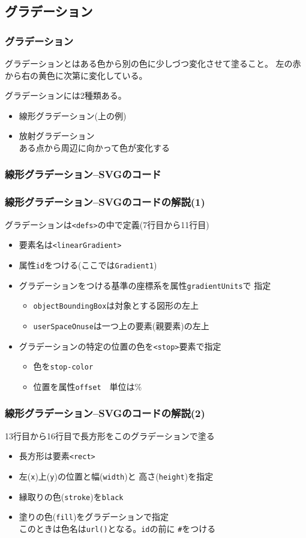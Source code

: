 \subsection{グラデーション}
\begin{frame}[containsverbatim]
 \frametitle{グラデーション}
 グラデーションとはある色から別の色に少しづつ変化させて塗ること。
 左の赤から右の黄色に次第に変化している。

 グラデーションには2種類ある。
 \begin{itemize}
	\item 線形グラデーション(上の例)
	\item 放射グラデーション\\
				ある点から周辺に向かって色が変化する
 \end{itemize}
\end{frame}
\begin{frame}[containsverbatim]
\frametitle{線形グラデーション--SVGのコード}
\end{frame}
\begin{frame}[containsverbatim]
 \frametitle{線形グラデーション--SVGのコードの解説(1)}
 グラデーションは\texttt{<defs>}の中で定義(7行目から11行目)
 \begin{itemize}
	\item 要素名は\texttt{<linearGradient>}
	\item 属性\texttt{id}をつける(ここでは\texttt{Gradient1})
	\item グラデーションをつける基準の座標系を属性\texttt{gradientUnits}で
				指定\\
				\begin{itemize}
				 \item \texttt{objectBoundingBox}は対象とする図形の左上
				 \item \texttt{userSpaceOnuse}は一つ上の要素(親要素)の左上
				\end{itemize}
	\item グラデーションの特定の位置の色を\texttt{<stop>}要素で指定
				\begin{itemize}
				 \item 色を\texttt{stop-color}
				 \item 位置を属性\texttt{offset}　単位は\%
				\end{itemize}
 \end{itemize}
\end{frame}
\begin{frame}[containsverbatim]
 \frametitle{線形グラデーション--SVGのコードの解説(2)}
13行目から16行目で長方形をこのグラデーションで塗る
 \begin{itemize}
	\item 長方形は要素\texttt{<rect>}
	\item 左(\texttt{x})上(\texttt{y})の位置と幅(\texttt{width})と
				高さ(\texttt{height})を指定
	\item 縁取りの色(\texttt{stroke})を\texttt{black}
	\item 塗りの色(\texttt{fill})をグラデーションで指定\\
				このときは色名は\texttt{url()}となる。\texttt{id}の前に
				\texttt{\#}をつける
 \end{itemize}
\end{frame}
